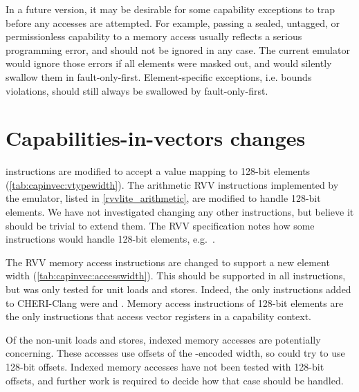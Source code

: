 In a future version, it may be desirable for some capability exceptions to trap before any accesses are attempted.
For example, passing a sealed, untagged, or permissionless capability to a memory access usually reflects a serious programming error, and should not be ignored in any case.
The current emulator would ignore those errors if all elements were masked out, and would silently swallow them in fault-only-first.
Element-specific exceptions, i.e. bounds violations, should still always be swallowed by fault-only-first.




\section{Capabilities-in-vectors changes}\label{appx:capinvec}
 instructions are modified to accept a  value mapping to 128-bit elements (\cref{tab:capinvec:vtypewidth}).
The arithmetic RVV instructions implemented by the emulator, listed in \cref{rvvlite_arithmetic}, are modified to handle 128-bit elements.
We have not investigated changing any other instructions, but believe it should be trivial to extend them.
The RVV specification notes how some instructions would handle 128-bit elements, e.g.~\cite[Chapter~13]{specification-RVV-v1.0}.

The RVV memory access instructions are changed to support a new element width (\cref{tab:capinvec:accesswidth}).
This should be supported in all instructions, but was only tested for unit loads and stores.
Indeed, the only instructions added to CHERI-Clang were  and .
Memory access instructions of 128-bit elements are the only instructions that access vector registers in a capability context.

Of the non-unit loads and stores, indexed memory accesses are potentially concerning.
These accesses use offsets of the -encoded width, so could try to use 128-bit offsets.
Indexed memory accesses have not been tested with 128-bit offsets, and further work is required to decide how that case should be handled.

